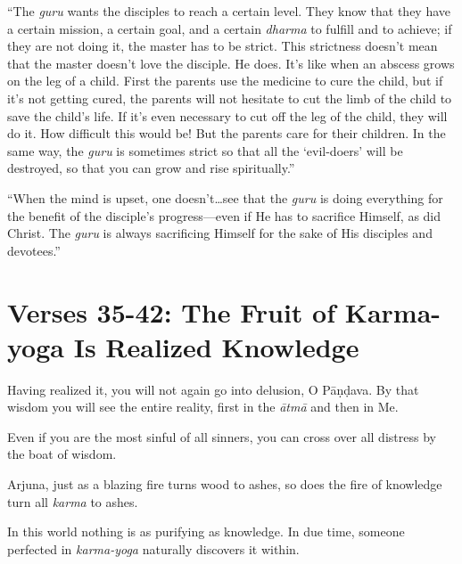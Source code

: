 \enquote{The \textit{guru} wants the disciples to reach a certain level. They know that they have a certain mission, a certain goal, and a certain \textit{dharma} to fulfill and to achieve; if they are not doing it, the master has to be strict. This strictness doesn’t mean that the master doesn’t love the disciple. He does. It’s like when an abscess grows on the leg of a child. First the parents use the medicine to cure the child, but if it’s not getting cured, the parents will not hesitate to cut the limb of the child to save the child’s life. If it’s even necessary to cut off the leg of the child, they will do it. How difficult this would be! But the parents care for their children. In the same way, the \textit{guru} is sometimes strict so that all the \enquote{evil-doers} will be destroyed, so that you can grow and rise spiritually.}

\enquote{When the mind is upset, one doesn’t\ldots see that the \textit{guru} is doing everything for the benefit of the disciple’s progress---even if He has to sacrifice Himself, as did Christ. The \textit{guru} is always sacrificing Himself for the sake of His disciples and devotees.}

\section{Verses 35-42: The Fruit of Karma-yoga Is Realized Knowledge}\label{sec-verses-35-42-the-fruit-of-karma-yoga-is-realized-knowledge}
{Having realized it, you will not again go into delusion, O Pāṇḍava. By that wisdom you will see the entire reality, first in the \textit{ātmā} and then in Me.}

{Even if you are the most sinful of all sinners, you can cross over all distress by the boat of wisdom.}

{Arjuna, just as a blazing fire turns wood to ashes, so does the fire of knowledge turn all \textit{karma} to ashes.}

{In this world nothing is as purifying as knowledge. In due time, someone perfected in \textit{karma-yoga} naturally discovers it within.}

